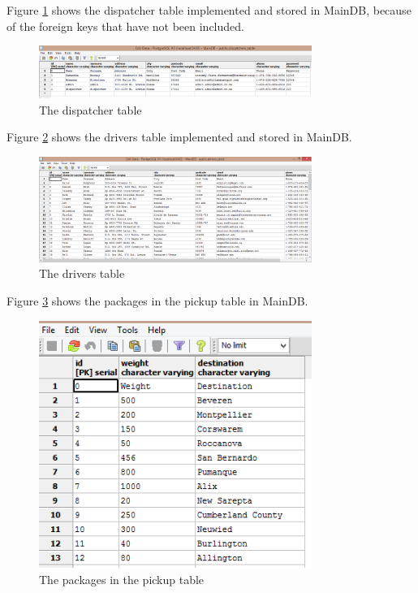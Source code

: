 \documentclass[paper=a4, fontsize=11pt]{scrartcl} %
\numberwithin{equation}{section} %
\numberwithin{figure}{section} %
\numberwithin{table}{section} %
\begin{document}
Figure \ref{DispatcherTable} shows the dispatcher table implemented and stored in MainDB, because of the foreign keys that have not been included. 
\begin{figure}[hbt!]
\centering
\includegraphics[width=3.5in]{pictures/screenshots/dispatchersdbscreen.png}
\caption{The dispatcher table}
\label{DispatcherTable}
\end{figure}

Figure \ref{DriversTable} shows the drivers table implemented and stored in MainDB. 
\begin{figure}[hbt!]
\centering
\includegraphics[width=3.5in]{pictures/screenshots/driversdbscreen.png}
\caption{The drivers table}
\label{DriversTable}
\end{figure}

Figure \ref{PackagePickupTable} shows the packages in the pickup table in MainDB.
\begin{figure}[hbt!]
\centering
\includegraphics[width=3.5in]{pictures/screenshots/packagespickupscreen.png}
\caption{The packages in the pickup table}
\label{PackagePickupTable}
\end{figure}
\end{document}
